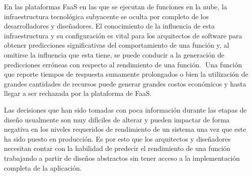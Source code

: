 En las plataformas FaaS en las que se ejecutan de funciones en la nube, la infraestructura tecnológica subyacente se oculta por completo de los desarrolladores y diseñadores. El conocimiento de la influencia de esta infraestructura y su configuración es vital para los arquitectos de software para obtener predicciones significativas del comportamiento de una función y, al omitirse la influencia que esta tiene, se puede conducir a la generación de predicciones erróneas con respecto al rendimiento de una función. Una función que reporte tiempos de respuesta sumamente prolongados o bien la utilización de grandes cantidades de recursos puede generar grandes costos económicos y hasta llegar a ser rechazada por la plataforma de FaaS.

Las decisiones que han sido tomadas con poca información durante las etapas de diseño usualmente son muy difíciles de alterar y pueden impactar de forma negativa en los niveles requeridos de rendimiento de un sistema una vez que este ha sido puesto en producción. Es por esto que los arquitectos y diseñadores necesitan contar con la habilidad de predecir el rendimiento de una función trabajando a partir de diseños abstractos sin tener acceso a la implementación completa de la aplicación.